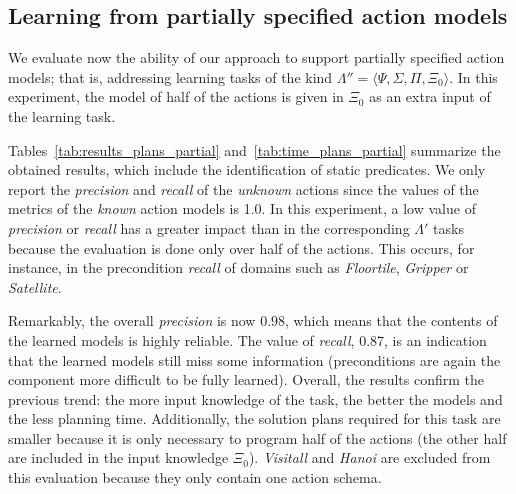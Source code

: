 \documentclass[3p,times]{elsarticle}
\newcommand{\tup}[1]{{\langle #1 \rangle}}
\begin{document}
\subsection{Learning from partially specified action models}

We evaluate now the ability of our approach to support partially specified action models; that is, addressing learning tasks of the kind $\Lambda''=\tup{\Psi,\Sigma,\Pi,\Xi_0}$. In this experiment, the model of half of the actions is given in $\Xi_0$ as an extra input of the learning task.

Tables~\ref{tab:results_plans_partial} and~\ref{tab:time_plans_partial} summarize the obtained results, which include the identification of static predicates. We only report the {\em precision} and {\em recall} of the {\em unknown} actions since the values of the metrics of the {\em known} action models is 1.0. In this experiment, a low value of {\em precision} or {\em recall} has a greater impact than in the corresponding $\Lambda'$ tasks because the evaluation is done only over half of the actions. This occurs, for instance, in the precondition \emph{recall} of domains such as {\em Floortile}, {\em Gripper} or {\em Satellite}.

Remarkably, the overall \emph{precision} is now $0.98$, which means that the contents of the learned models is highly reliable. The value of \emph{recall}, 0.87, is an indication that the learned models still miss some information (preconditions are again the component more difficult to be fully learned). Overall, the results confirm the previous trend: the more input knowledge of the task, the better the models and the less planning time. Additionally, the solution plans required for this task are smaller because it is only necessary to program half of the actions (the other half are included in the input knowledge $\Xi_0$). {\em Visitall} and {\em Hanoi} are excluded from this evaluation because they only contain one action schema.

\end{document}

